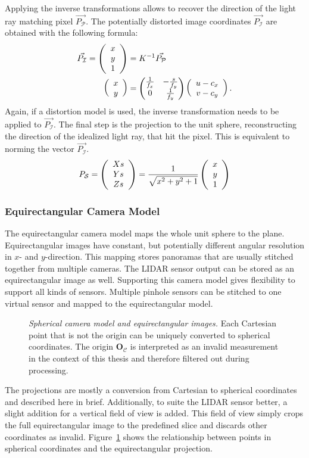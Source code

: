 Applying the inverse transformations allows to recover the direction of the light ray matching pixel $\vec{P_\mathcal{P}}$.
The potentially distorted image coordinates $\vec{P_\mathcal{I}}$ are obtained with the following formula:
\begin{equation}
\begin{aligned}
    \vec{P_\mathcal{I}} = \left(\begin{array}{c} x \\ y \\ 1 \end{array}\right) &= K^{-1} \vec{P_\mathcal{P}} \\
    \left(\begin{array}{c} x \\ y \end{array}\right) &= \begin{pmatrix}\frac{1}{f_x} & -\frac{s}{f_y} \\ 0 & \frac{1}{f_y}\end{pmatrix} \left(\begin{array}{c} u - c_x \\ v - c_y \end{array}\right)\text{.}
\end{aligned}
\end{equation}
Again, if a distortion model is used, the inverse transformation needs to be applied to $\vec{P_\mathcal{I}}$.
The final step is the projection to the unit sphere, reconstructing the direction of the idealized light ray, that hit the pixel.
This is equivalent to norming the vector $\vec{P_\mathcal{I}}$.
\begin{equation}
    P_\mathcal{S} = \left(\begin{array}{c} Xs \\ Ys \\ Zs \end{array}\right) = \frac{1}{\sqrt{x^2 + y^2 + 1}} \left(\begin{array}{c} x \\ y \\ 1 \end{array}\right)
    \label{eq:pinhole_backward}
\end{equation}

\subsubsection{Equirectangular Camera Model}

The equirectangular camera model maps the whole unit sphere to the plane\cite[p. 90]{snyder_1987}.
Equirectangular images have constant, but potentially different angular resolution in $x$- and $y$-direction.
This mapping stores panoramas that are usually stitched together from multiple cameras.
The \acrshort{LIDAR} sensor output can be stored as an equirectangular image as well.
Supporting this camera model gives flexibility to support all kinds of sensors.
Multiple pinhole sensors can be stitched to one virtual sensor and mapped to the equirectangular model.
\begin{figure}[b!]
    \scalebox{0.9}{%
    
    }
    \caption[Spherical camera model and equirectangular images]{\emph{Spherical camera model and equirectangular images.} Each Cartesian point that is not the origin can be uniquely converted to spherical coordinates. The origin $\mathbf{O_\mathcal{C}}$ is interpreted as an invalid measurement in the context of this thesis and therefore filtered out during processing.}\label{fig:spherical}
\end{figure}
The projections are mostly a conversion from Cartesian to spherical coordinates and described here in brief.
Additionally, to suite the \acrshort{LIDAR} sensor better, a slight addition for a vertical field of view is added.
This field of view simply crops the full equirectangular image to the predefined slice and discards other coordinates as invalid.
Figure~\ref{fig:spherical} shows the relationship between points in spherical coordinates and the equirectangular projection.

